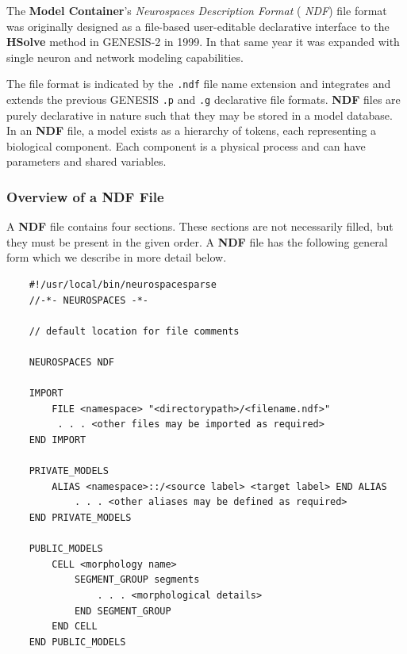\documentclass[12pt]{article}
\begin{document}
The {\bf Model Container}'s {\it Neurospaces Description Format} ({\it
  NDF}) file format was originally designed as a file-based
user-editable declarative interface to the {\bf HSolve} method in
GENESIS-2 in 1999\cite{cornelis03:_neuros}.  In that same year it was
expanded with single neuron and network modeling capabilities.

The file format is indicated by the {\tt .ndf} file name extension and
integrates and extends the previous GENESIS {\tt .p} and {\tt .g}
declarative file formats.  {\bf NDF} files are purely declarative in
nature such that they may be stored in a model database. In an {\bf
  NDF} file, a model exists as a hierarchy of tokens, each
representing a biological component.  Each component is a physical
process and can have parameters and shared variables.

\subsubsection*{Overview of a {\bf NDF} File}
\label{sec:overview-ndf-file}
A {\bf NDF} file contains four sections. These sections are not necessarily
filled, but they must be present in the given order.  A {\bf NDF} file has
the following general form which we describe in more detail below.

\begin{center}
 \begin{linenumbers}
\begin{verbatim}
    #!/usr/local/bin/neurospacesparse
    //-*- NEUROSPACES -*-

    // default location for file comments

    NEUROSPACES NDF

    IMPORT
        FILE <namespace> "<directorypath>/<filename.ndf>"
         . . . <other files may be imported as required>
    END IMPORT

    PRIVATE_MODELS
        ALIAS <namespace>::/<source label> <target label> END ALIAS
            . . . <other aliases may be defined as required>
    END PRIVATE_MODELS

    PUBLIC_MODELS
        CELL <morphology name>
            SEGMENT_GROUP segments
                . . . <morphological details>
            END SEGMENT_GROUP
        END CELL
    END PUBLIC_MODELS
\end{verbatim}
\end{linenumbers}
\end{center}
\end{document}
